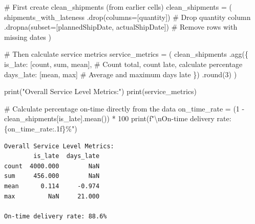 \documentclass[
  letterpaper,
  DIV=11,
  numbers=noendperiod]{scrartcl}
\newenvironment{Shaded}{\begin{snugshade}}{\end{snugshade}}
\newcommand{\BuiltInTok}[1]{\textcolor[rgb]{0.00,0.23,0.31}{#1}}
\newcommand{\CharTok}[1]{\textcolor[rgb]{0.13,0.47,0.30}{#1}}
\newcommand{\CommentTok}[1]{\textcolor[rgb]{0.37,0.37,0.37}{#1}}
\newcommand{\DecValTok}[1]{\textcolor[rgb]{0.68,0.00,0.00}{#1}}
\newcommand{\NormalTok}[1]{\textcolor[rgb]{0.00,0.23,0.31}{#1}}
\newcommand{\OperatorTok}[1]{\textcolor[rgb]{0.37,0.37,0.37}{#1}}
\newcommand{\SpecialCharTok}[1]{\textcolor[rgb]{0.37,0.37,0.37}{#1}}
\newcommand{\SpecialStringTok}[1]{\textcolor[rgb]{0.13,0.47,0.30}{#1}}
\newcommand{\StringTok}[1]{\textcolor[rgb]{0.13,0.47,0.30}{#1}}
\begin{document}
\begin{Shaded}
\begin{Highlighting}[]
\CommentTok{\# First create clean\_shipments (from earlier cells)}
\NormalTok{clean\_shipments }\OperatorTok{=}\NormalTok{ (}
\NormalTok{    shipments\_with\_lateness}
\NormalTok{    .drop(columns}\OperatorTok{=}\NormalTok{[}\StringTok{\textquotesingle{}quantity\textquotesingle{}}\NormalTok{])  }\CommentTok{\# Drop quantity column}
\NormalTok{    .dropna(subset}\OperatorTok{=}\NormalTok{[}\StringTok{\textquotesingle{}plannedShipDate\textquotesingle{}}\NormalTok{, }\StringTok{\textquotesingle{}actualShipDate\textquotesingle{}}\NormalTok{])  }\CommentTok{\# Remove rows with missing dates}
\NormalTok{)}

\CommentTok{\# Then calculate service metrics}
\NormalTok{service\_metrics }\OperatorTok{=}\NormalTok{ (}
\NormalTok{    clean\_shipments}
\NormalTok{    .agg(\{}
        \StringTok{\textquotesingle{}is\_late\textquotesingle{}}\NormalTok{: [}\StringTok{\textquotesingle{}count\textquotesingle{}}\NormalTok{, }\StringTok{\textquotesingle{}sum\textquotesingle{}}\NormalTok{, }\StringTok{\textquotesingle{}mean\textquotesingle{}}\NormalTok{],  }\CommentTok{\# Count total, count late, calculate percentage}
        \StringTok{\textquotesingle{}days\_late\textquotesingle{}}\NormalTok{: [}\StringTok{\textquotesingle{}mean\textquotesingle{}}\NormalTok{, }\StringTok{\textquotesingle{}max\textquotesingle{}}\NormalTok{]  }\CommentTok{\# Average and maximum days late}
\NormalTok{    \})}
\NormalTok{    .}\BuiltInTok{round}\NormalTok{(}\DecValTok{3}\NormalTok{)}
\NormalTok{)}

\BuiltInTok{print}\NormalTok{(}\StringTok{"Overall Service Level Metrics:"}\NormalTok{)}
\BuiltInTok{print}\NormalTok{(service\_metrics)}

\CommentTok{\# Calculate percentage on{-}time directly from the data}
\NormalTok{on\_time\_rate }\OperatorTok{=}\NormalTok{ (}\DecValTok{1} \OperatorTok{{-}}\NormalTok{ clean\_shipments[}\StringTok{\textquotesingle{}is\_late\textquotesingle{}}\NormalTok{].mean()) }\OperatorTok{*} \DecValTok{100}
\BuiltInTok{print}\NormalTok{(}\SpecialStringTok{f"}\CharTok{\textbackslash{}n}\SpecialStringTok{On{-}time delivery rate: }\SpecialCharTok{\{}\NormalTok{on\_time\_rate}\SpecialCharTok{:.1f\}}\SpecialStringTok{\%"}\NormalTok{)}
\end{Highlighting}
\end{Shaded}

\begin{verbatim}
Overall Service Level Metrics:
        is_late  days_late
count  4000.000        NaN
sum     456.000        NaN
mean      0.114     -0.974
max         NaN     21.000

On-time delivery rate: 88.6%
\end{verbatim}
\end{document}
